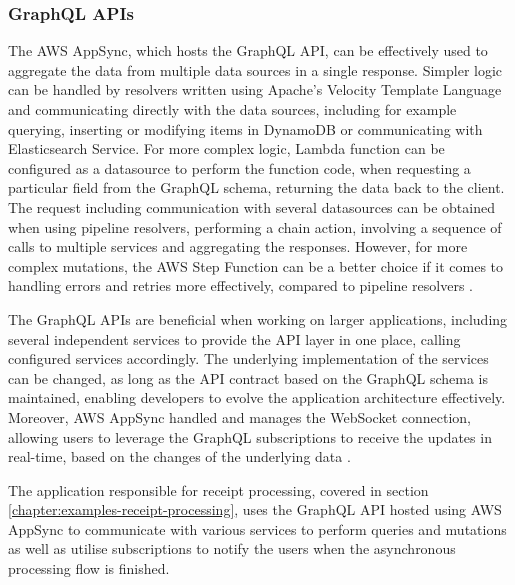 \subsubsection{GraphQL APIs} \label{chapter:client-graphql-apis}

The AWS AppSync, which hosts the GraphQL API, can be effectively used to aggregate the data from multiple data sources in a single response.
Simpler logic can be handled by resolvers written using Apache’s Velocity Template Language and communicating directly with the data sources, including for example querying, inserting or modifying items in DynamoDB or communicating with Elasticsearch Service.
For more complex logic, Lambda function can be configured as a datasource to perform the function code, when requesting a particular field from the GraphQL schema, returning the data back to the client.
The request including communication with several datasources can be obtained when using pipeline resolvers, performing a chain action, involving a sequence of calls to multiple services and aggregating the responses.
However, for more complex mutations, the AWS Step Function can be a better choice if it comes to handling errors and retries more effectively, compared to pipeline resolvers \cite{ServerlessArchitecturalPatternsAndBestPractices}.

The GraphQL APIs are beneficial when working on larger applications, including several independent services to provide the API layer in one place, calling configured services accordingly.
The underlying implementation of the services can be changed, as long as the API contract based on the GraphQL schema is maintained, enabling developers to evolve the application architecture effectively.
Moreover, AWS AppSync handled and manages the WebSocket connection, allowing users to leverage the GraphQL subscriptions to receive the updates in real-time, based on the changes of the underlying data \cite{DevelopServerlessGraphQLArchitecturesUsingAWSAppSync}.

The application responsible for receipt processing, covered in section \ref{chapter:examples-receipt-processing}, uses the GraphQL API hosted using AWS AppSync to communicate with various services to perform queries and mutations as well as utilise subscriptions to notify the users when the asynchronous processing flow is finished.

